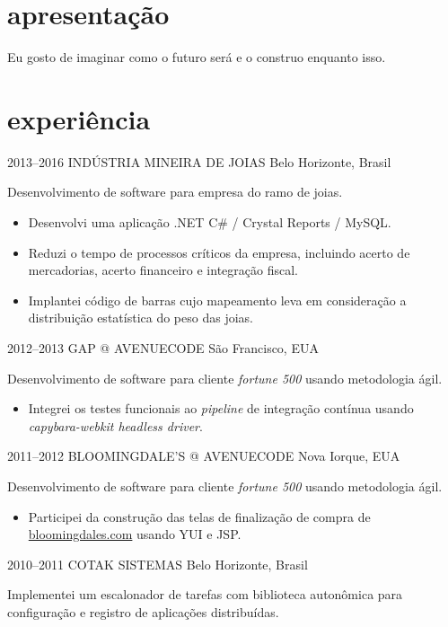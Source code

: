 \documentclass[]{friggeri-cv}
\begin{document}
\section{apresentação}
Eu gosto de imaginar como o futuro será e o construo enquanto isso.

\section{experiência}

\begin{entrylist}

\entry
{2013--2016}
{INDÚSTRIA MINEIRA DE JOIAS}
{Belo Horizonte, Brasil}
{ Desenvolvimento de software para empresa do ramo de joias.

  \begin{itemize}
    \item Desenvolvi uma aplicação .NET C\# / Crystal Reports / MySQL.
    \item Reduzi o tempo de processos críticos da empresa, incluindo acerto de mercadorias, acerto financeiro e integração fiscal.
    \item Implantei código de barras cujo mapeamento leva em consideração a distribuição estatística do peso das joias.
  \end{itemize}
  }

\entry
{2012--2013}
{GAP @ AVENUECODE}
{São Francisco, EUA}
{ Desenvolvimento de software para cliente \textit{fortune 500} usando metodologia ágil.
  \begin{itemize}
    \item Integrei os testes funcionais ao \textit{pipeline} de integração contínua usando \textit{capybara-webkit headless driver}.
  \end{itemize}
}



\entry
{2011--2012}
{BLOOMINGDALE'S @ AVENUECODE}
{Nova Iorque, EUA}
{ Desenvolvimento de software para cliente \textit{fortune 500} usando metodologia ágil.

  \begin{itemize}
    \item Participei da construção das telas de finalização de compra de \href{http://www.bloomingdales.com}{bloomingdales.com} usando YUI e JSP.
  \end{itemize}
}

\entry
{2010--2011}
{COTAK SISTEMAS}
{Belo Horizonte, Brasil}
{ Implementei um escalonador de tarefas com biblioteca autonômica para configuração e registro de aplicações distribuídas.

}
\end{entrylist}
\end{document}

